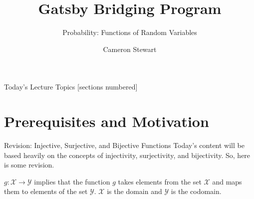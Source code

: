 \documentclass[10pt]{beamer}
\title{Gatsby Bridging Program}
\subtitle{Probability: Functions of Random Variables}
\date{}
\author{Cameron Stewart}
\institute{Gatsby Computational Neuroscience Unit}
\begin{document}
\maketitle

\begin{frame}{Today's Lecture Topics}
  [sections numbered]
  \tableofcontents%
\end{frame}

\section{Prerequisites and Motivation}

\begin{frame}[fragile]{Revision: Injective, Surjective, and Bijective Functions}
Today's content will be based heavily on the concepts of injectivity, surjectivity, and bijectivity. So, here is some revision.

\(g: \mathcal{X}\rightarrow\mathcal{Y}\) implies that the function \(g\) takes elements from the set \(\mathcal{X}\) and maps them to elements of the set \(\mathcal{Y}\). \(\mathcal{X}\) is the domain and \(\mathcal{Y}\) is the codomain.
\end{frame}
\end{document}
